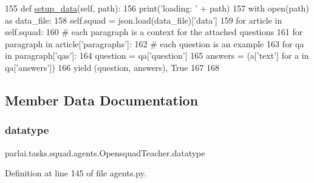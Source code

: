 \begin{DoxyCode}
155     \textcolor{keyword}{def }\hyperlink{namespaceparlai_1_1tasks_1_1multinli_1_1agents_a4fa2cb0ba1ed745336ad8bceed36b841}{setup\_data}(self, path):
156         print(\textcolor{stringliteral}{'loading: '} + path)
157         with open(path) \textcolor{keyword}{as} data\_file:
158             self.squad = json.load(data\_file)[\textcolor{stringliteral}{'data'}]
159         \textcolor{keywordflow}{for} article \textcolor{keywordflow}{in} self.squad:
160             \textcolor{comment}{# each paragraph is a context for the attached questions}
161             \textcolor{keywordflow}{for} paragraph \textcolor{keywordflow}{in} article[\textcolor{stringliteral}{'paragraphs'}]:
162                 \textcolor{comment}{# each question is an example}
163                 \textcolor{keywordflow}{for} qa \textcolor{keywordflow}{in} paragraph[\textcolor{stringliteral}{'qas'}]:
164                     question = qa[\textcolor{stringliteral}{'question'}]
165                     answers = (a[\textcolor{stringliteral}{'text'}] \textcolor{keywordflow}{for} a \textcolor{keywordflow}{in} qa[\textcolor{stringliteral}{'answers'}])
166                     \textcolor{keywordflow}{yield} (question, answers), \textcolor{keyword}{True}
167 
168 
\end{DoxyCode}


\subsection{Member Data Documentation}
\mbox{\label{classparlai_1_1tasks_1_1squad_1_1agents_1_1OpensquadTeacher_afcbd95d073286e65923c88490ed03e35}} 
\subsubsection{\texorpdfstring{datatype}{datatype}}
{\footnotesize\ttfamily parlai.\+tasks.\+squad.\+agents.\+Opensquad\+Teacher.\+datatype}



Definition at line 145 of file agents.\+py.

\mbox{\label{classparlai_1_1tasks_1_1squad_1_1agents_1_1OpensquadTeacher_a623ab6df284c53f1266c9a24e95c981b}} 
